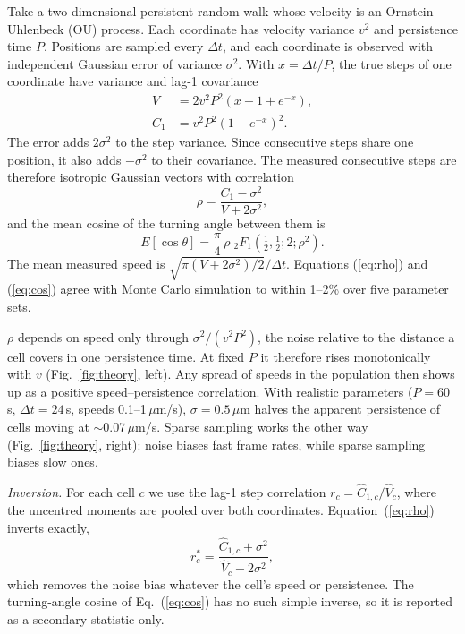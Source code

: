 \documentclass[aps,pre,10pt,twocolumn,superscriptaddress,amsmath,amssymb,floatfix]{revtex4-2}
\begin{document}
Take a two-dimensional persistent random walk whose velocity is an Ornstein--Uhlenbeck (OU) process. Each coordinate has velocity variance $v^2$ and persistence time $P$. Positions are sampled every $\Delta t$, and each coordinate is observed with independent Gaussian error of variance $\sigma^2$. With $x=\Delta t/P$, the true steps of one coordinate have variance and lag-1 covariance
\begin{align}
V&=2v^2P^2\left(x-1+e^{-x}\right),\\
C_1&=v^2P^2\left(1-e^{-x}\right)^2 .
\end{align}
The error adds $2\sigma^2$ to the step variance. Since consecutive steps share one position, it also adds $-\sigma^2$ to their covariance. The measured consecutive steps are therefore isotropic Gaussian vectors with correlation
\begin{equation}
\rho=\frac{C_1-\sigma^2}{V+2\sigma^2},
\label{eq:rho}
\end{equation}
and the mean cosine of the turning angle between them is
\begin{equation}
E[\cos\theta]=\frac{\pi}{4}\,\rho\;{}_2F_1\!\left(\tfrac12,\tfrac12;2;\rho^2\right).
\label{eq:cos}
\end{equation}
The mean measured speed is $\sqrt{\pi(V+2\sigma^2)/2}/\Delta t$. Equations (\ref{eq:rho}) and (\ref{eq:cos}) agree with Monte Carlo simulation to within 1--2\% over five parameter sets.

$\rho$ depends on speed only through $\sigma^2/(v^2P^2)$, the noise relative to the distance a cell covers in one persistence time. At fixed $P$ it therefore rises monotonically with $v$ (Fig.~\ref{fig:theory}, left). Any spread of speeds in the population then shows up as a positive speed--persistence correlation. With realistic parameters ($P=60$\,s, $\Delta t=24$\,s, speeds 0.1--1\,$\mu$m/s), $\sigma=0.5$\,$\mu$m halves the apparent persistence of cells moving at $\sim$0.07\,$\mu$m/s. Sparse sampling works the other way (Fig.~\ref{fig:theory}, right): noise biases fast frame rates, while sparse sampling biases slow ones.

\emph{Inversion.} For each cell $c$ we use the lag-1 step correlation $r_c=\hat C_{1,c}/\hat V_c$, where the uncentred moments are pooled over both coordinates. Equation~(\ref{eq:rho}) inverts exactly,
\begin{equation}
r_c^*=\frac{\hat C_{1,c}+\sigma^2}{\hat V_c-2\sigma^2},
\label{eq:inv}
\end{equation}
which removes the noise bias whatever the cell's speed or persistence. The turning-angle cosine of Eq.~(\ref{eq:cos}) has no such simple inverse, so it is reported as a secondary statistic only.
\end{document}
